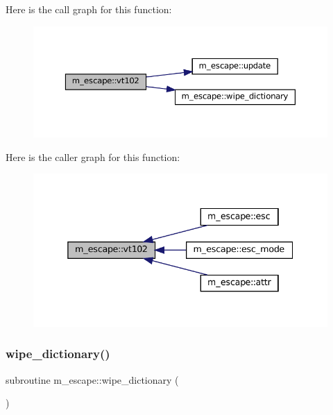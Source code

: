 Here is the call graph for this function\+:\nopagebreak
\begin{figure}[H]
\begin{center}
\leavevmode
\includegraphics[width=350pt]{namespacem__escape_ae9d40717b2e75e90e2505d5fed6435c5_cgraph}
\end{center}
\end{figure}
Here is the caller graph for this function\+:\nopagebreak
\begin{figure}[H]
\begin{center}
\leavevmode
\includegraphics[width=338pt]{namespacem__escape_ae9d40717b2e75e90e2505d5fed6435c5_icgraph}
\end{center}
\end{figure}
\mbox{\label{namespacem__escape_a1bc574bc97157fe67d868d2bd180c91e}} 
\subsubsection{\texorpdfstring{wipe\+\_\+dictionary()}{wipe\_dictionary()}}
{\footnotesize\ttfamily subroutine m\+\_\+escape\+::wipe\+\_\+dictionary (\begin{DoxyParamCaption}{ }\end{DoxyParamCaption})\hspace{0.3cm}{\ttfamily [private]}}



